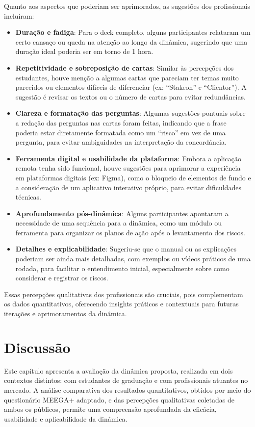 \documentclass[
	12pt,
	openright,
	twoside,
	a4paper,
	english,
	brazil
	]{abntex2}
\begin{document}
Quanto aos aspectos que poderiam ser aprimorados, as sugestões dos profissionais incluíram:
\begin{itemize}
  \item \textbf{Duração e fadiga}: Para o deck completo, alguns participantes relataram um certo cansaço ou queda na atenção ao longo da dinâmica, sugerindo que uma duração ideal poderia ser em torno de 1 hora.
  \item \textbf{Repetitividade e sobreposição de cartas}: Similar às percepções dos estudantes, houve menção a algumas cartas que pareciam ter temas muito parecidos ou elementos difíceis de diferenciar (ex:  “Stakeon” e  “Clientor”). A sugestão é revisar os textos ou o número de cartas para evitar redundâncias.
  \item \textbf{Clareza e formatação das perguntas}: Algumas sugestões pontuais sobre a redação das perguntas nas cartas foram feitas, indicando que a frase poderia estar diretamente formatada como um “risco” em vez de uma pergunta, para evitar ambiguidades na interpretação da concordância.
  \item \textbf{Ferramenta digital e usabilidade da plataforma}: Embora a aplicação remota tenha sido funcional, houve sugestões para aprimorar a experiência em plataformas digitais (ex: Figma), como o bloqueio de elementos de fundo e a consideração de um aplicativo interativo próprio, para evitar dificuldades técnicas.
  \item \textbf{Aprofundamento pós-dinâmica}: Alguns participantes apontaram a necessidade de uma sequência para a dinâmica, como um módulo ou ferramenta para organizar os planos de ação após o levantamento dos riscos.
  \item \textbf{Detalhes e explicabilidade}: Sugeriu-se que o manual ou as explicações poderiam ser ainda mais detalhadas, com exemplos ou vídeos práticos de uma rodada, para facilitar o entendimento inicial, especialmente sobre como considerar e registrar os riscos.
\end{itemize}

Essas percepções qualitativas dos profissionais são cruciais, pois complementam os dados quantitativos, oferecendo insights práticos e contextuais para futuras iterações e aprimoramentos da dinâmica.

\section{Discussão}
\label{sec:discussao}

Este capítulo apresenta a avaliação da dinâmica proposta, realizada em dois contextos distintos: com estudantes de graduação e com profissionais atuantes no mercado. A análise comparativa dos resultados quantitativos, obtidos por meio do questionário MEEGA+ adaptado, e das percepções qualitativas coletadas de ambos os públicos, permite uma compreensão aprofundada da eficácia, usabilidade e aplicabilidade da dinâmica.
\end{document}
